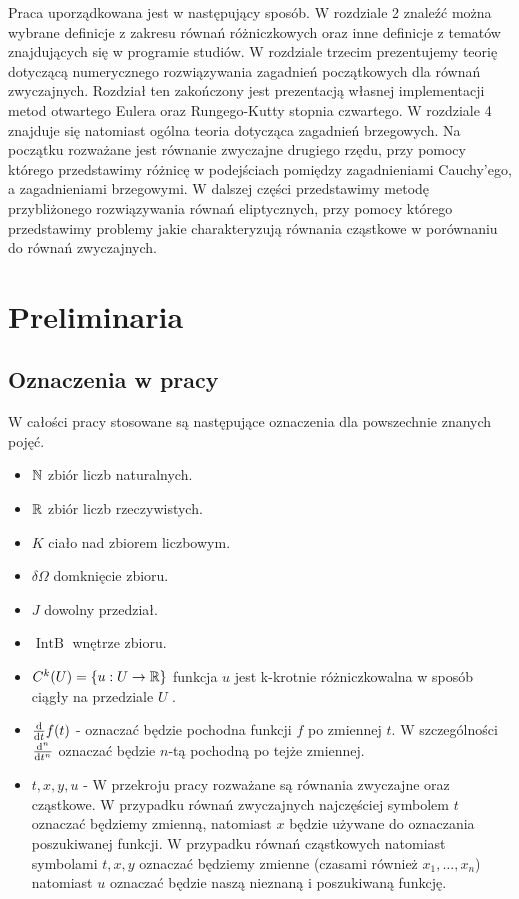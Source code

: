 \documentclass[12pt,a4paper]{report}
\begin{document}
Praca uporządkowana jest w następujący sposób. W rozdziale 2 znaleźć można wybrane definicje z zakresu równań różniczkowych oraz inne definicje z tematów znajdujących się w programie studiów. W rozdziale trzecim prezentujemy teorię dotyczącą numerycznego rozwiązywania zagadnień początkowych dla równań zwyczajnych. Rozdział ten zakończony jest prezentacją własnej implementacji metod otwartego Eulera oraz Rungego-Kutty stopnia czwartego. W rozdziale 4 znajduje się natomiast ogólna teoria dotycząca zagadnień brzegowych. Na początku rozważane jest równanie zwyczajne drugiego rzędu, przy pomocy którego przedstawimy różnicę w podejściach pomiędzy zagadnieniami Cauchy'ego, a zagadnieniami brzegowymi. W dalszej części przedstawimy metodę przybliżonego rozwiązywania równań eliptycznych, przy pomocy którego przedstawimy problemy jakie charakteryzują równania cząstkowe w porównaniu do równań zwyczajnych. 

\chapter{Preliminaria}

\section{Oznaczenia w pracy}

W całości pracy stosowane są następujące oznaczenia dla powszechnie znanych pojęć.
\begin{itemize}
\item $\setN$ zbiór liczb naturalnych.
\item $\setR$ zbiór liczb rzeczywistych.
\item $K$ ciało nad zbiorem liczbowym.
\item $\delta \Omega $ domknięcie zbioru.
\item $J$ dowolny przedział.
\item $\operatorname{IntB}$ wnętrze zbioru.
\item $C^k(U) = \set{u: U \to \setR} $ funkcja $u$ jest k-krotnie różniczkowalna w sposób ciągły na przedziale $U$ \citep{evans2012rownania}.
\item $\ddx{t} f(t)$ - oznaczać będzie pochodna funkcji $f$ po zmiennej $t$. W szczególności $\ddx[^n]{t^n}$ oznaczać będzie $n$-tą pochodną po tejże zmiennej.
\item $t, x, y, u$ - W przekroju pracy rozważane są równania zwyczajne oraz cząstkowe. W przypadku równań zwyczajnych najczęściej symbolem $t$ oznaczać będziemy zmienną, natomiast $x$ będzie używane do oznaczania poszukiwanej funkcji. W przypadku równań cząstkowych natomiast symbolami $t,x,y$ oznaczać będziemy zmienne (czasami również $x_1,\ldots,x_n$) natomiast $u$ oznaczać będzie naszą nieznaną i poszukiwaną funkcję.
\end{itemize}
\end{document}
